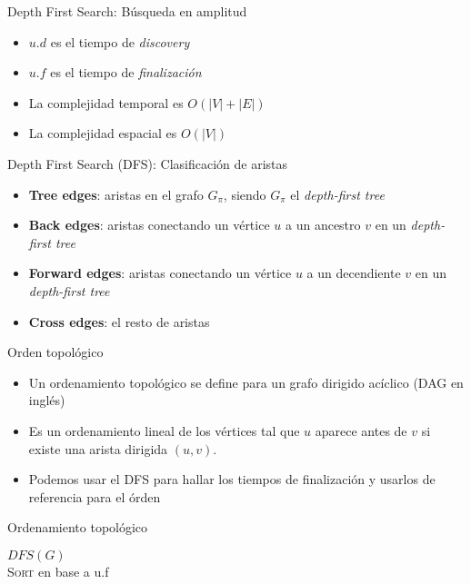 \documentclass[]{beamer}
\begin{document}
\begin{frame}{Depth First Search: B\'usqueda en amplitud}
  \begin{itemize}
    \item $u.d$ es el tiempo de \textit{discovery}
      \pause
    \item $u.f$ es el tiempo de \textit{finalizaci\'on}
      \pause
    \item La complejidad temporal es $O(|V| + |E|)$
      \pause
    \item La complejidad espacial es $O(|V|)$
  \end{itemize}
\end{frame}

\begin{frame}{Depth First Search (DFS): Clasificaci\'on de aristas}
  \begin{itemize}
    \item \textbf{Tree edges}: aristas en el grafo $G_{\pi}$, siendo $G_{\pi}$ el \textit{depth-first tree}
      \pause
    \item \textbf{Back edges}: aristas conectando un v\'ertice $u$ a un ancestro $v$ en un \textit{depth-first tree}
      \pause
    \item \textbf{Forward edges}: aristas conectando un v\'ertice $u$ a un decendiente $v$ en un \textit{depth-first tree}
      \pause
    \item \textbf{Cross edges}: el resto de aristas
  \end{itemize}
\end{frame}

\begin{frame}{Orden topol\'ogico}
  \begin{itemize}
    \item Un ordenamiento topol\'ogico se define para un grafo dirigido ac\'iclico (DAG en ingl\'es)
      \pause
    \item Es un ordenamiento lineal de los v\'ertices tal que $u$ aparece antes de $v$ si existe una arista dirigida $(u,v)$. 
      \pause
    \item Podemos usar el DFS para hallar los tiempos de finalizaci\'on y usarlos de referencia para el \'orden
  \end{itemize}
\end{frame}

\begin{frame}{Ordenamiento topol\'ogico}
  \begin{algorithm}[H]
    \textsc{$DFS(G)$} \\
    \textsc{Sort} en base a u.f
  \end{algorithm}
\end{frame}
\end{document}

